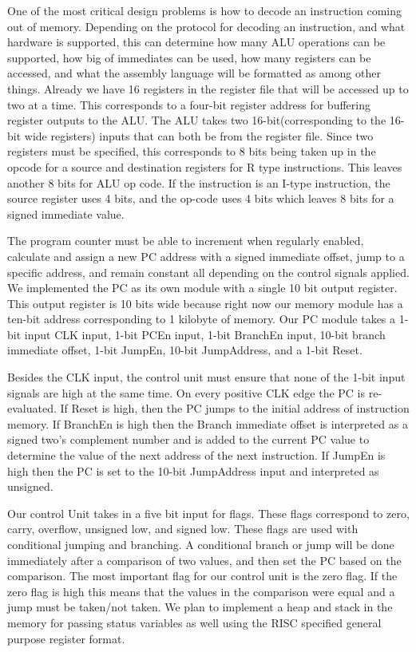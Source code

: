 \documentclass[onecolumn, 12pt]{IEEEtran}
\begin{document}
\par
	One of the most critical design problems is how to decode an instruction coming out of memory. Depending on the protocol for decoding an instruction, and what hardware is supported, this can determine how many ALU operations can be supported, how big of immediates can be used, how many registers can be accessed, and what the assembly language will be formatted as among other things. Already we have 16 registers in the register file that will be accessed up to two at a time. This corresponds to a four-bit register address for buffering register outputs to the ALU. The ALU takes two 16-bit(corresponding to the 16-bit wide registers) inputs that can both be from the register file. Since two registers must be specified, this corresponds to 8 bits being taken up in the opcode for a source and destination registers for R type instructions. This leaves another 8 bits for ALU op code. If the instruction is an I-type instruction, the source register uses 4 bits, and the op-code uses 4 bits which leaves 8 bits for a signed immediate value.
\par
	The program counter must be able to increment when regularly enabled, calculate and assign a new PC address with a signed immediate offset, jump to a specific address, and remain constant all depending on the control signals applied. We implemented the PC as its own module with a single 10 bit output register. This output register is 10 bits wide because right now our memory module has a ten-bit address corresponding to 1 kilobyte of memory. Our PC module takes a 1-bit input CLK input, 1-bit PCEn input, 1-bit BranchEn input, 10-bit branch immediate offset, 1-bit JumpEn, 10-bit JumpAddress, and a 1-bit Reset.
\par
	Besides the CLK input, the control unit must ensure that none of the 1-bit input signals are high at the same time. On every positive CLK edge the PC is re-evaluated. If Reset is high, then the PC jumps to the initial address of instruction memory. If BranchEn is high then the Branch immediate offset is interpreted as a signed two's complement number and is added to the current PC value to determine the value of the next address of the next instruction. If JumpEn is high then the PC is set to the 10-bit JumpAddress input and interpreted as unsigned.
\par
	Our control Unit takes in a five bit input for flags. These flags correspond to zero, carry, overflow, unsigned low, and signed low. These flags are used with conditional jumping and branching. A conditional branch or jump will be done immediately after a comparison of two values, and then set the PC based on the comparison. The most important flag for our control unit is the zero flag. If the zero flag is high this means that the values in the comparison were equal and a jump must be taken/not taken. We plan to implement a heap and stack in the memory for passing status variables as well using the RISC specified general purpose register format.
\end{document}
